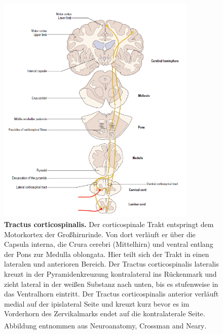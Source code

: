 \documentclass[12pt,a4paper,pdftex]{article}
\begin{document}
\begin{figure}[H]
    \centering
    \includegraphics[width=0.85\textwidth]{pictures/Bilder_Laura/corticospinal_tract.PNG}
    \caption[Tractus corticospinalis]{\textbf{Tractus corticospinalis.} Der corticospinale Trakt entspringt dem Motorkortex der Großhirnrinde. Von dort verläuft er über die Capsula interna, die Crura cerebri (Mittelhirn) und ventral entlang der Pons zur Medulla oblongata. Hier teilt sich der Trakt in einen lateralen und anterioren Bereich. Der Tractus corticospinalis lateralis kreuzt in der Pyramidenkreuzung kontralateral ins Rückenmark und zieht lateral in der weißen Substanz nach unten, bis es stufenweise in das Ventralhorn eintritt. Der Tractus corticospinalis anterior verläuft medial auf der ipislateral Seite und kreuzt kurz bevor es im Vorderhorn des Zervikalmarks endet auf die kontralaterale Seite. Abbildung entnommen aus Neuroanatomy, Crossman and Neary\textsuperscript{\cite[8]{crossman2014neuroanatomy}}.}
    \label{fig:tr_corticospinalis}
\end{figure}
\end{document}
